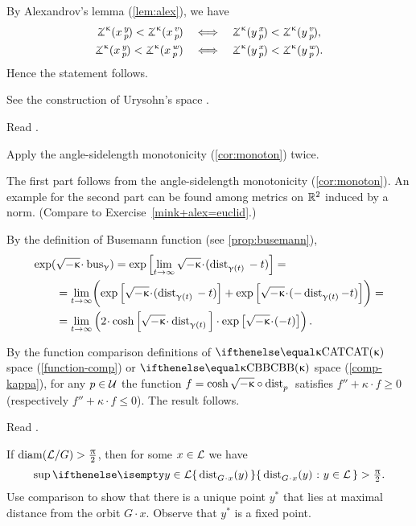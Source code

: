 By Alexandrov's lemma (\ref{lem:alex}), we have
\begin{align*}
\angk\kappa xyp<\angk\kappa xvp
\quad&\Longleftrightarrow\quad
\angk\kappa yxp<\angk\kappa yvp,
\\
\angk\kappa xyp<\angk\kappa xwp
\quad&\Longleftrightarrow\quad
\angk\kappa yxp<\angk\kappa ywp.
\end{align*}
Hence the statement follows.


See the construction of Urysohn's space \cite[3.11$\tfrac{3}{2}_+$]{gromov-MS}.

Read \cite{lebedeva-petrunin}.

Apply the angle-sidelength  monotonicity (\ref{cor:monoton}) twice. 

The first part follows from the angle-sidelength  monotonicity (\ref{cor:monoton}).
An example for the second part can be found among metrics on $\mathbb{R}^2$ induced by a norm. (Compare to Exercise~\ref{mink+alex=euclid}.)

By the definition of Busemann function (see  \ref{prop:busemann}),
\begin{align*}
\exp(&\sqrt{-\kappa}\cdot\bus_\gamma) 
= \exp \left[\lim_{t\to \infty} \sqrt{-\kappa}\cdot(\distfun{{\gamma (t)}}{}{} - t)\right]=
\\
&= \lim_{t\to \infty} \biggl(\exp \left[\sqrt{-\kappa}\cdot(\distfun{\gamma (t)}{}{} -t)\right]
+\exp\left[\sqrt{-\kappa}\cdot(-\distfun{\gamma (t)}-t)\right]\biggr)=
\\
&=  \lim_{t\to \infty} \left(2\cdot \cosh \left[\sqrt{-\kappa}\cdot\distfun{\gamma (t)}{}{}\right]\cdot \exp\left[\sqrt{-\kappa}\cdot(-t)\right]\right).
\end{align*}

By the function comparison definitions of $\CAT\kappa$ space (\ref{function-comp}) or $\Alex{\kappa}$ space (\ref{comp-kappa}),  for any $p\in \spc{U}$ the function $f=\cosh \sqrt{-\kappa}\circ\distfun{p}{}{}$ satisfies $f''+\kappa \cdot f\ge 0$ (respectively  $f''+\kappa \cdot f\le 0$). The result follows.

Read \cite{petrunin:globalization}.

 If $\mathop{\rm diam}\nolimits(\mathcal{L}/G)>\tfrac{\uppi}2$, then for some $x\in \spc{L}$ we have
\[\sup \set{\distfun{G\cdot x}(y)}{y\in \spc{L}}
>
\tfrac\pi2.\]
Use comparison to show that there is a unique point $y^{*}$ that lies at maximal distance from the orbit $G\cdot x$.
Observe that $y^{*}$ is a fixed point.

